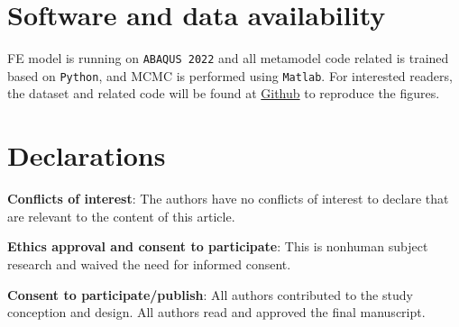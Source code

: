 \section{Software and data availability}\label{sec: github}\noindent
FE model is running on \texttt{ABAQUS 2022} and all metamodel code related is trained based on \texttt{Python}, and MCMC is performed using \texttt{Matlab}. For interested readers, the dataset and related code will be found at \href{https://github.com/ningxin999/fullfield_spatiotemporal}{Github} to reproduce the figures.


\section{Declarations}\noindent
\textbf{Conflicts of interest}: The authors have no conflicts of interest to declare that are relevant to the content of this article.

\noindent\textbf{Ethics approval and consent to participate}: This is nonhuman subject research and waived the need for informed consent.

\noindent\textbf{Consent to participate/publish}: All authors contributed to the study conception and design. All authors read and approved the final
manuscript.


